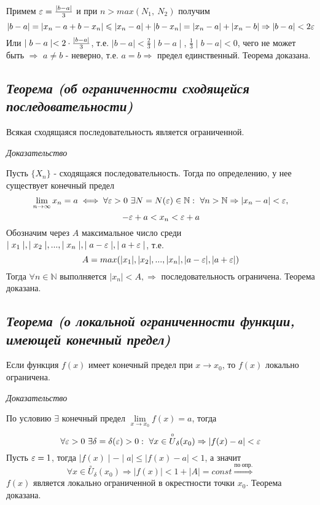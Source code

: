 Примем ${\large\varepsilon} = {\large\frac{\mid  b - a\mid  }{3}}$ и при $n > max(N_1, \ N_2)$ получим $$| b - a|  = | x_n - a + b - x_n|  \leqslant | x_n - a|  + | b - x_n|  = | x_n - a|  + | x_n - b|  \Rightarrow | b - a|  < 2{\large\varepsilon}$$ Или $\mid  b-a\mid   < 2 \cdot {\large\frac{\mid  b - a\mid  }{3}}$, т.е. $\mid  b-a\mid   < \frac{2}{3}\mid  b - a\mid  $, $\frac{1}{3}\mid  b-a\mid   < 0$, чего не может быть $\Rightarrow$ $a \neq b$ - неверно, т.е. $a = b \Rightarrow$ предел единственный. Теорема доказана.
\subsection{\textit{Теорема (об ограниченности сходящейся последовательности)}}

Всякая сходящаяся последовательность является ограниченной.

\textit{Доказательство}

Пусть $\{X_n\}$ - сходящаяся последовательность. Тогда по определению, у нее существует конечный предел $$\lim\limits_{n \to \infty}x_n = a \iff \forall {\large\varepsilon} > 0 \ \exists N = N({\large\varepsilon})\in \mathbb{N}: \ \forall n > \mathbb{N} \Rightarrow | x_n - a|  < {\large\varepsilon},$$ $$-{\large\varepsilon}+a < x_n < {\large\varepsilon} + a$$ Обозначим через $A$ максимальное число среди $\mid  x_1\mid  , \mid  x_2\mid  , ..., \mid  x_n\mid  , \mid  a-{\large\varepsilon}\mid  , \mid  a + {\large\varepsilon}\mid  $, т.е. $$A = max(| x_1| , | x_2| , ..., | x_n| , | a-{\large\varepsilon}| , | a + {\large\varepsilon}| )$$ Тогда $\forall n \in \mathbb{N}$ выполняется $\mid  x_n\mid   < A, \Rightarrow$ последовательность ограничена. Теорема доказана.
\subsection{\textit{Теорема (о локальной ограниченности функции, имеющей конечный предел)}}

Если функция $f(x)$ имеет конечный предел при $x \rightarrow x_0$, то $f(x)$ локально ограничена.

\textit{Доказательство}

По условию $\exists$ конечный предел $\lim\limits_{x \to x_0}f(x) = a$, тогда $$\forall {\large\varepsilon} > 0 \ \exists\delta=\delta({\large\varepsilon} )>0: \ \forall x \in \overset{\circ}U_\delta(x_0) \Rightarrow | f(x) - a|  < {\large\varepsilon}$$ Пусть ${\large\varepsilon} = 1$, тогда $\mid  f(x)\mid   - \mid  a\mid   \leqslant \mid  f(x) - a\mid   < 1$, а значит $$\forall x \in \overset{\circ}U_\delta(x_0) \Rightarrow | f(x)|  <1 + | A|  = const \overset{по\ опр.}{\Rightarrow}$$ $f(x)$ является локально ограниченной в окрестности точки $x_0$. Теорема доказана.
